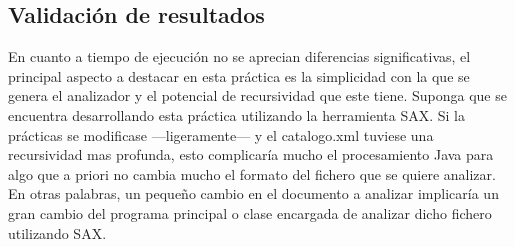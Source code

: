 



\subsection{Validación de resultados}

En cuanto a tiempo de ejecución no se aprecian diferencias significativas, el principal aspecto a destacar en esta práctica es la simplicidad con la que se genera el analizador y el potencial de recursividad que este tiene. 
Suponga que se encuentra desarrollando esta práctica utilizando la herramienta SAX. Si la prácticas se modificase ---ligeramente--- y el catalogo.xml tuviese una recursividad mas profunda, esto complicaría mucho el procesamiento Java para algo que a priori no cambia mucho el formato del fichero que se quiere analizar. En otras palabras, un pequeño cambio en el documento a analizar implicaría un gran cambio del programa principal o clase encargada de analizar dicho fichero utilizando SAX.


